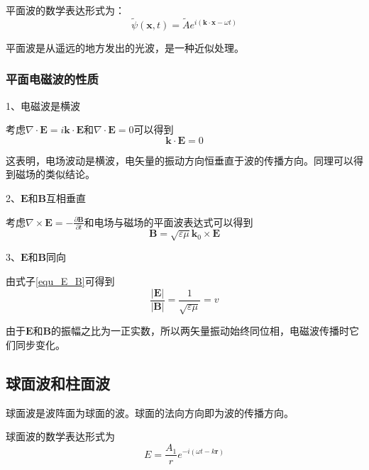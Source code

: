 \documentclass[UTF8]{ctexart}
\begin{document}
	平面波的数学表达形式为：
	\begin{equation}
		\tilde{\psi}(\boldsymbol{x}, t)=\tilde{A} e^{i(\boldsymbol{k} \cdot \boldsymbol{x}-\omega t)}
	\end{equation}
	
\noindent 平面波是从遥远的地方发出的光波，是一种近似处理。

	\subsubsection{平面电磁波的性质}
	1、电磁波是横波
	
	考虑$ \nabla \cdot \boldsymbol{E} = i \boldsymbol{k} \cdot \boldsymbol{E} $和$ \nabla \cdot \boldsymbol{E} = 0 $可以得到
	\begin{equation}
		\boldsymbol{k} \cdot \boldsymbol{E} = 0
	\end{equation}
	
\noindent 这表明，电场波动是横波，电矢量的振动方向恒垂直于波的传播方向。同理可以得到磁场的类似结论。

	2、$ \boldsymbol{E} $和$ \boldsymbol{B} $互相垂直
	
	考虑$ \nabla \times \boldsymbol{E} = - \frac{\partial \boldsymbol{B}}{\partial t} $和电场与磁场的平面波表达式可以得到
	\begin{equation}
		\boldsymbol{B} = \sqrt{\varepsilon \mu} \boldsymbol{k}_{0} \times \boldsymbol{E}\label{equ_E_B}
	\end{equation}
	
	3、$ \boldsymbol{E} $和$ \boldsymbol{B} $同向
	
	由式子\ref{equ_E_B}可得到
	\begin{equation}
		\frac{|\boldsymbol{E}|}{|\boldsymbol{B}|}=\frac{1}{\sqrt{\varepsilon \mu}}=v
	\end{equation}
	
\noindent 由于$ \boldsymbol{E} $和$ \boldsymbol{B} $的振幅之比为一正实数，所以两矢量振动始终同位相，电磁波传播时它们同步变化。

	\subsection{球面波和柱面波}
	球面波是波阵面为球面的波。球面的法向方向即为波的传播方向。
	
	球面波的数学表达形式为
	\begin{equation}
		E=\frac{A_{1}}{r} e^{-i(\omega t-k \boldsymbol{r})}
	\end{equation}
	
\end{document}
